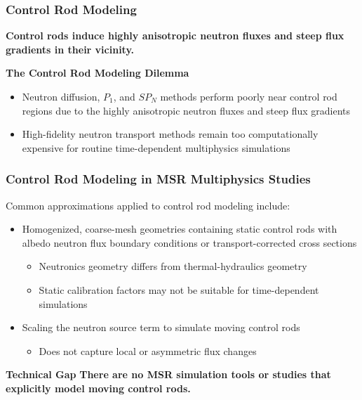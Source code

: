 \begin{frame}
  \frametitle{Control Rod Modeling}
  \textbf{Control rods induce highly anisotropic neutron fluxes and steep flux gradients in their
  vicinity.}
  \begin{block}{\textbf{The Control Rod Modeling Dilemma}}
    \begin{itemize}
      \item Neutron diffusion, $P_1$, and $SP_N$ methods perform poorly near control rod regions
        due to the highly anisotropic neutron fluxes and steep flux gradients
      \item High-fidelity neutron transport methods remain too computationally expensive for
        routine time-dependent multiphysics simulations
    \end{itemize}
  \end{block}
\end{frame}

\begin{frame}
  \frametitle{Control Rod Modeling in MSR Multiphysics Studies}
  \vspace{.2cm}

  Common approximations applied to control rod modeling include:
  \begin{itemize}
    \item Homogenized, coarse-mesh geometries containing static control rods with albedo neutron
      flux boundary conditions \cite{kophazi_development_2009} or transport-corrected cross
      sections \cite{cui_development_2021, jaradat_development_2021, yang_development_2022}
      \begin{itemize}
        \item Neutronics geometry differs from thermal-hydraulics geometry
        \item Static calibration factors may not be suitable for time-dependent simulations
      \end{itemize}
    \item Scaling the neutron source term to simulate moving control rods
      \cite{delpech_benchmark_2003, krepel_dyn3d-msr_2007, jaradat_development_2021,
      yang_development_2022}
      \begin{itemize}
        \item Does not capture local or asymmetric flux changes
      \end{itemize}
  \end{itemize}

  \begin{block}{\textbf{Technical Gap}}
    \textbf{There are no MSR simulation tools or studies that explicitly model moving control rods.}
  \end{block}
\end{frame}
